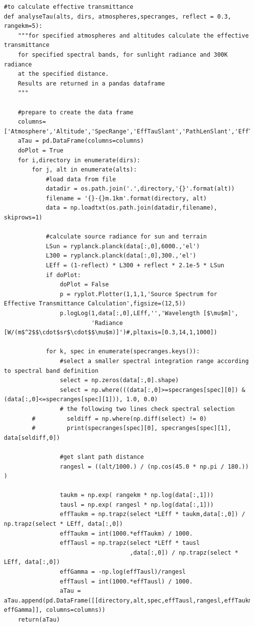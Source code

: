 \documentclass{workpackage}
\begin{document}
\begin{lstlisting}[style=incellstyle,caption={Code Listing in cell 27 \label{lst:autolistingcell27}}]
#to calculate effective transmittance
def analyseTau(alts, dirs, atmospheres,specranges, reflect = 0.3, rangekm=5):
    """for specified atmospheres and altitudes calculate the effective transmittance
    for specified spectral bands, for sunlight radiance and 300K radiance 
    at the specified distance.
    Results are returned in a pandas dataframe
    """
        
    #prepare to create the data frame
    columns=['Atmosphere','Altitude','SpecRange','EffTauSlant','PathLenSlant','EffTauRange','PathLenRange','effGamma']
    aTau = pd.DataFrame(columns=columns)
    doPlot = True
    for i,directory in enumerate(dirs):
        for j, alt in enumerate(alts):
            #load data from file
            datadir = os.path.join('.',directory,'{}'.format(alt))
            filename = '{}-{}m.1km'.format(directory, alt)
            data = np.loadtxt(os.path.join(datadir,filename), skiprows=1)

            #calculate source radiance for sun and terrain
            LSun = ryplanck.planck(data[:,0],6000.,'el')
            L300 = ryplanck.planck(data[:,0],300.,'el')
            LEff = (1-reflect) * L300 + reflect * 2.1e-5 * LSun
            if doPlot:
                doPlot = False
                p = ryplot.Plotter(1,1,1,'Source Spectrum for Effective Transmittance Calculation',figsize=(12,5))
                p.logLog(1,data[:,0],LEff,'','Wavelength [$\mu$m]',
                         'Radiance [W/(m$^2$$\cdot$sr$\cdot$$\mu$m)]')#,pltaxis=[0.3,14,1,1000])
                    
            for k, spec in enumerate(specranges.keys()):
                #select a smaller spectral integration range according to spectral band definition
                select = np.zeros(data[:,0].shape)
                select = np.where(((data[:,0]>=specranges[spec][0]) & (data[:,0]<=specranges[spec][1])), 1.0, 0.0)
                # the following two lines check spectral selection
        #         seldiff = np.where(np.diff(select) != 0)
        #         print(specranges[spec][0], specranges[spec][1], data[seldiff,0])
                    
                #get slant path distance
                rangesl = ((alt/1000.) / (np.cos(45.0 * np.pi / 180.)) )

                taukm = np.exp( rangekm * np.log(data[:,1]))
                tausl = np.exp( rangesl * np.log(data[:,1]))
                effTaukm = np.trapz(select *LEff * taukm,data[:,0]) / np.trapz(select * LEff, data[:,0])
                effTaukm = int(1000.*effTaukm) / 1000.
                effTausl = np.trapz(select *LEff * tausl
                                    ,data[:,0]) / np.trapz(select * LEff, data[:,0])
                effGamma = -np.log(effTausl)/rangesl
                effTausl = int(1000.*effTausl) / 1000.
                aTau = aTau.append(pd.DataFrame([[directory,alt,spec,effTausl,rangesl,effTaukm,rangekm, effGamma]], columns=columns))
    return(aTau)    
\end{lstlisting}
\end{document}
